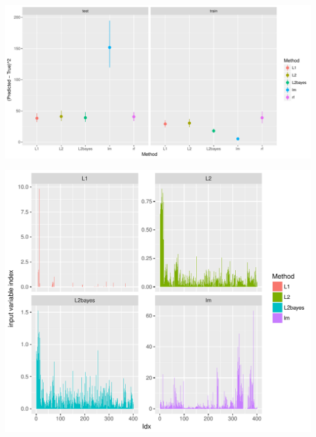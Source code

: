 \begin{frame}
\begin{analysis}
\bigskip

\bigskip
\begin{center}
\includegraphics[scale=0.47]{../LectureAssets/L07/ozone_MSE}
\end{center}

\smallskip
\end{analysis}
\end{frame}

\begin{frame}
\begin{analysis}
\smallskip
\begin{center}
\includegraphics[scale=0.47]{../LectureAssets/L07/ozone_coeff}
\end{center}

\end{analysis}
\end{frame}

